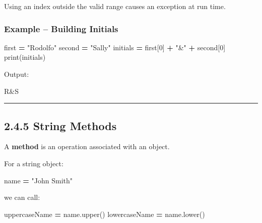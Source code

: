 \documentclass[
]{article}
\newenvironment{Shaded}{\begin{snugshade}}{\end{snugshade}}
\newcommand{\BuiltInTok}[1]{#1}
\newcommand{\DecValTok}[1]{\textcolor[rgb]{0.00,0.00,0.81}{#1}}
\newcommand{\NormalTok}[1]{#1}
\newcommand{\OperatorTok}[1]{\textcolor[rgb]{0.81,0.36,0.00}{\textbf{#1}}}
\newcommand{\StringTok}[1]{\textcolor[rgb]{0.31,0.60,0.02}{#1}}
\begin{document}
Using an index outside the valid range causes an exception at run time.

\subsubsection{Example -- Building
Initials}\label{example-building-initials}

\begin{Shaded}
\begin{Highlighting}[]
\NormalTok{first }\OperatorTok{=} \StringTok{"Rodolfo"}
\NormalTok{second }\OperatorTok{=} \StringTok{"Sally"}
\NormalTok{initials }\OperatorTok{=}\NormalTok{ first[}\DecValTok{0}\NormalTok{] }\OperatorTok{+} \StringTok{"\&"} \OperatorTok{+}\NormalTok{ second[}\DecValTok{0}\NormalTok{]}
\BuiltInTok{print}\NormalTok{(initials)}
\end{Highlighting}
\end{Shaded}

Output:

\begin{Shaded}
\begin{Highlighting}[]
\NormalTok{R\&S}
\end{Highlighting}
\end{Shaded}

\begin{center}\rule{0.5\linewidth}{0.5pt}\end{center}

\subsection{2.4.5 String Methods}\label{string-methods}

A \textbf{method} is an operation associated with an object.

For a string object:

\begin{Shaded}
\begin{Highlighting}[]
\NormalTok{name }\OperatorTok{=} \StringTok{"John Smith"}
\end{Highlighting}
\end{Shaded}

we can call:

\begin{Shaded}
\begin{Highlighting}[]
\NormalTok{uppercaseName }\OperatorTok{=}\NormalTok{ name.upper()}
\NormalTok{lowercaseName }\OperatorTok{=}\NormalTok{ name.lower()}
\end{Highlighting}
\end{Shaded}
\end{document}
